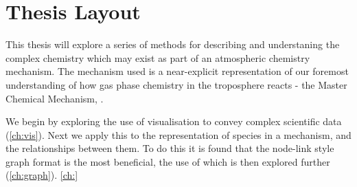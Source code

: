 
\section{Thesis Layout}
This thesis will explore a series of methods for describing and understaning the complex chemistry which may exist as part of an atmospheric chemistry mechanism. The mechanism used is a near-explicit representation of our foremost understanding of how gas phase chemistry in the troposphere reacts - the Master Chemical Mechanism, \citep{mcm}.

We begin by exploring the use of visualisation to convey complex scientific data (\autoref{ch:vis}). Next we apply this to the representation of species in a mechanism, and the relationships between them. To do this it is found that the node-link style graph format is the most beneficial, the use of which is then explored further (\autoref{ch:graph}). \autoref{ch:}
